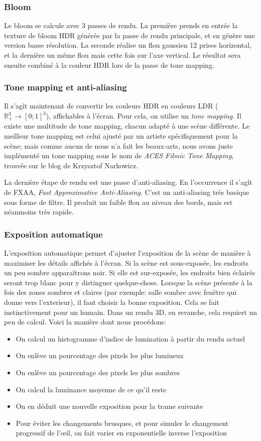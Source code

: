 \documentclass[a4paper,12pt]{article}
\begin{document}
\subsubsection{Bloom}
Le bloom se calcule avec 3 passes de rendu. La première prends en entrée la texture de bloom HDR générée par la passe de rendu principale,
et en génère une version basse résolution. La seconde réalise un flou gaussien 12 prises horizontal, et la dernière un même flou mais cette
fois sur l'axe vertical. Le résultat sera ensuite combiné à la couleur HDR lors de la passe de tone mapping.

\subsubsection{Tone mapping et anti-aliasing}
Il s'agît maintenant de convertir les couleurs HDR en couleurs LDR ($\mathbb{R}_+^3 \to [0; 1]^3$), affichables à l'écran.
Pour cela, on utilise un \emph{tone mapping}. Il existe une multitude de tone mapping, chacun adapté à une scène différente.
Le meilleur tone mapping est celui ajusté par un artiste spécifiquement pour la scène; mais comme aucun de nous n'a fait les
beaux-arts, nous avons juste implémenté un tone mapping sous le nom de \emph{ACES Filmic Tone Mapping}, trouvée sur le blog de
Krzysztof Narkowicz.

La dernière étape de rendu est une passe d'anti-aliasing. En l'occurrence il s'agît de FXAA, \emph{Fast Approximative Anti-Aliasing}.
C'est un anti-aliasing très basique sous forme de filtre. Il produit un faible flou au niveau des bords, mais est néanmoins très rapide.

\subsubsection{Exposition automatique}
L'exposition automatique permet d'ajuster l'exposition de la scène de manière à maximiser les détails affichés à l'écran. Si la scène
est sous-exposée, les endroits un peu sombre apparaîtrons noir. Si elle est sur-exposée, les endroits bien éclairés seront trop blanc
pour y distinguer quelque-chose. Lorsque la scène présente à la fois des zones sombres et claires (par exemple: salle sombre avec fenêtre
qui donne vers l'exterieur), il faut choisir la bonne exposition. Cela se fait instinctivement pour un humain. Dans un rendu 3D, en revanche,
cela requiert un peu de calcul. Voici la manière dont nous procédons:
\begin{itemize}
    \item On calcul un histogramme d'indice de lumination à partir du rendu actuel
    \item On enlève un pourcentage des pixels les plus lumineux
    \item On enlève un pourcentage des pixels les plus sombres
    \item On calcul la luminance moyenne de ce qu'il reste
    \item On en déduit une nouvelle exposition pour la trame suivante
    \item Pour éviter les changements brusques, et pour simuler le changement progressif de l'œil, on fait varier en exponentielle inverse l'exposition
\end{itemize}
\end{document}
